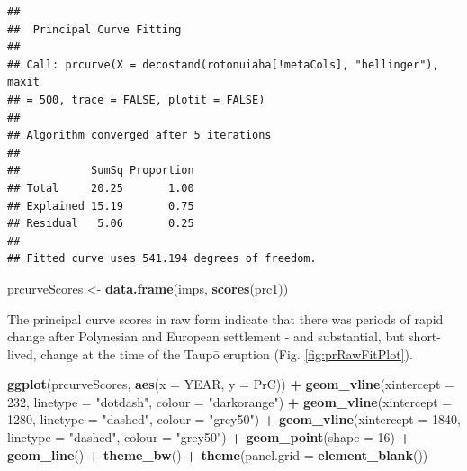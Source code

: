 \documentclass[nofonts,]{tufte-handout}
\newenvironment{Shaded}{\begin{snugshade}}{\end{snugshade}}
\newcommand{\AttributeTok}[1]{\textcolor[rgb]{0.13,0.29,0.53}{#1}}
\newcommand{\DecValTok}[1]{\textcolor[rgb]{0.00,0.00,0.81}{#1}}
\newcommand{\FunctionTok}[1]{\textcolor[rgb]{0.13,0.29,0.53}{\textbf{#1}}}
\newcommand{\NormalTok}[1]{#1}
\newcommand{\OtherTok}[1]{\textcolor[rgb]{0.56,0.35,0.01}{#1}}
\newcommand{\SpecialCharTok}[1]{\textcolor[rgb]{0.81,0.36,0.00}{\textbf{#1}}}
\newcommand{\StringTok}[1]{\textcolor[rgb]{0.31,0.60,0.02}{#1}}
\begin{document}
\begin{verbatim}
## 
##  Principal Curve Fitting
## 
## Call: prcurve(X = decostand(rotonuiaha[!metaCols], "hellinger"), maxit
## = 500, trace = FALSE, plotit = FALSE)
## 
## Algorithm converged after 5 iterations
## 
##           SumSq Proportion
## Total     20.25       1.00
## Explained 15.19       0.75
## Residual   5.06       0.25
## 
## Fitted curve uses 541.194 degrees of freedom.
\end{verbatim}

\begin{Shaded}
\begin{Highlighting}[]
\NormalTok{prcurveScores }\OtherTok{\textless{}{-}} \FunctionTok{data.frame}\NormalTok{(imps, }\FunctionTok{scores}\NormalTok{(prc1)) }
\end{Highlighting}
\end{Shaded}

The principal curve scores in raw form indicate that there was periods
of rapid change after Polynesian and European settlement - and
substantial, but short-lived, change at the time of the Taupō eruption
(Fig. \ref{fig:prRawFitPlot}).

\begin{Shaded}
\begin{Highlighting}[]
\FunctionTok{ggplot}\NormalTok{(prcurveScores, }
       \FunctionTok{aes}\NormalTok{(}\AttributeTok{x =}\NormalTok{ YEAR, }\AttributeTok{y =}\NormalTok{ PrC)) }\SpecialCharTok{+}
  \FunctionTok{geom\_vline}\NormalTok{(}\AttributeTok{xintercept =} \DecValTok{232}\NormalTok{, }\AttributeTok{linetype =} \StringTok{"dotdash"}\NormalTok{,}
             \AttributeTok{colour =} \StringTok{"darkorange"}\NormalTok{) }\SpecialCharTok{+}
  \FunctionTok{geom\_vline}\NormalTok{(}\AttributeTok{xintercept =} \DecValTok{1280}\NormalTok{, }\AttributeTok{linetype =} \StringTok{"dashed"}\NormalTok{,}
             \AttributeTok{colour =} \StringTok{"grey50"}\NormalTok{) }\SpecialCharTok{+}
  \FunctionTok{geom\_vline}\NormalTok{(}\AttributeTok{xintercept =} \DecValTok{1840}\NormalTok{, }\AttributeTok{linetype =} \StringTok{"dashed"}\NormalTok{,}
             \AttributeTok{colour =} \StringTok{"grey50"}\NormalTok{) }\SpecialCharTok{+}
  \FunctionTok{geom\_point}\NormalTok{(}\AttributeTok{shape =} \DecValTok{16}\NormalTok{) }\SpecialCharTok{+} 
  \FunctionTok{geom\_line}\NormalTok{() }\SpecialCharTok{+}
  \FunctionTok{theme\_bw}\NormalTok{()  }\SpecialCharTok{+} 
  \FunctionTok{theme}\NormalTok{(}\AttributeTok{panel.grid =} \FunctionTok{element\_blank}\NormalTok{())}
\end{Highlighting}
\end{Shaded}
\end{document}
